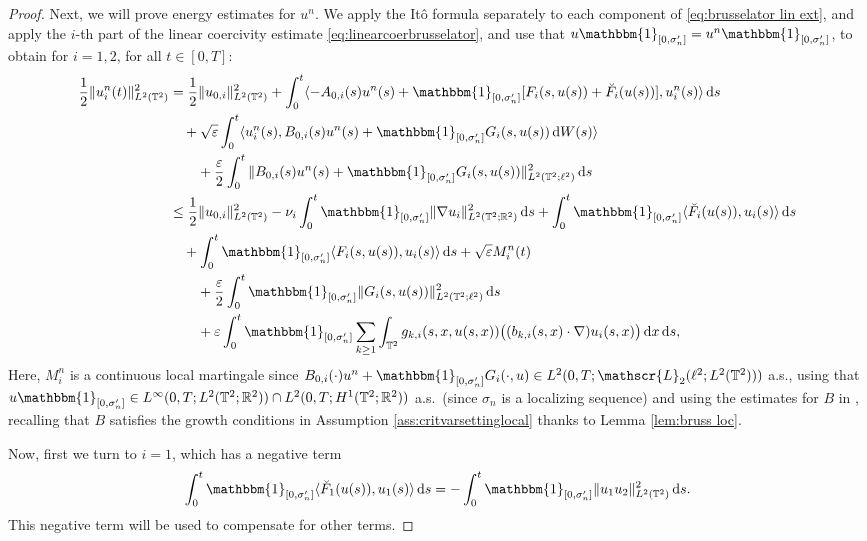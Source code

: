 \documentclass{amsart}
\newcommand{\dd}{\,\mathrm{d}}
\newcommand{\one}{\mathbbm{1}}
\newcommand{\<}{\langle}
\newcommand{\?}{\rangle}
\newcommand{\Tor}{\mathbb{T}}
\renewcommand{\Tor}{\mathbb{T}^2}
\theoremstyle{plain}
\theoremstyle{remark}
\theoremstyle{plain}
\numberwithin{equation}{section}
\def\R{{\mathbb R}}
\newcommand{\eps}{\varepsilon}
\begin{document}
\begin{proof}
Next, we will prove energy estimates for $u^n$. 
We apply the It\^o formula separately  to each component of \eqref{eq:brusselator lin ext},  and apply the $i$-th part of the linear coercivity estimate \eqref{eq:linearcoerbrusselator}, and use that  $u\one_{[0,\sigma_n']}=u^n\one_{[0,\sigma_n']}$, to obtain  for $i=1,2$, for all $t\in[0,T]$: 
\begin{align}
  \frac12 \|u^n_i(t)\|_{L^2(\Tor)}^2&= \frac12 \|u_{0,i}\|_{L^2(\Tor)}^2+ \int_0^t\<-A_{0,i}(s)u^n(s)+\one_{[0,\sigma_n']}[{F}_i(s,u(s))+\breve{F}_i(u(s))],u^n_i(s)\?\dd s \notag\\
   &\quad+ \sqrt{\eps}\int_0^t\<u^n_i(s),B_{0,i}(s)u^n(s)+\one_{[0,\sigma_n']}G_i(s,u(s))\dd W(s)\?\notag\\
   &\qquad+\frac{\eps}{2}\int_0^t\|B_{0,i}(s)u^n(s)+\one_{[0,\sigma_n']}G_i(s,u(s))\|_{L^2(\Tor;\ell^2)}^2\dd s \notag\\
   &\leq \frac12 \|u_{0,i}\|_{L^2(\Tor)}^2- \nu_i \int_0^t\one_{[0,\sigma_n']}\|\nabla u_i \|_{L^2(\Tor;\R^2)}^2\dd s + \int_0^t\one_{[0,\sigma_n']}\<\breve{F}_i(u(s)),u_i(s)\?\dd s \notag\\ 
   &\quad+  \int_0^t\one_{[0,\sigma_n']}\<F_i(s,u(s)),u_i(s)\? \dd s+\sqrt{\eps}M_i^n(t) \notag\\
   &\qquad+\frac{\eps}{2}\int_0^t\one_{[0,\sigma_n']}\|G_i(s,u(s))\|_{L^2(\Tor;\ell^2)}^2\dd s\notag\\
   &\qquad+\eps\int_0^t\one_{[0,\sigma_n']}\sum_{k\geq 1}\int_{\Tor}g_{k,i}(s,x,u(s,x))\big((b_{k,i}(s,x)\cdot\nabla)u_i(s,x)\big)\dd x\dd s,\label{eq:Ito comp1}
\end{align} 
Here, $M_i^n$ is a continuous local martingale since $B_{0,i}(\cdot)u^n+\one_{[0,\sigma_n']}G_i(\cdot,u)\in L^2(0,T;\mathscr{L}_2(\ell^2;L^2(\Tor)))$ a.s., using that $u\one_{[0,\sigma_n']}\in L^\infty(0,T;L^2(\Tor;\R^2))\cap L^2(0,T;H^1(\Tor;\R^2))$ a.s.\ (since $\sigma_n$ is a localizing sequence) and using the estimates for $B$ in \cite[Lem.\ 3.8]{TV24}, recalling  that $B$ satisfies the growth conditions in Assumption \ref{ass:critvarsettinglocal} thanks to Lemma \ref{lem:bruss loc}. 

Now, first we turn to $i=1$, which has a  negative term  
\[
\int_0^t\one_{[0,\sigma_n']}\<\breve{F}_1(u(s)),u_1(s)\?\dd s= 
- \int_0^t\one_{[0,\sigma_n']}\| u_1 u_2\|_{L^2(\Tor)}^2 \dd s.
\]
This negative term will be used to compensate for other terms.  


\end{proof}
\end{document}
